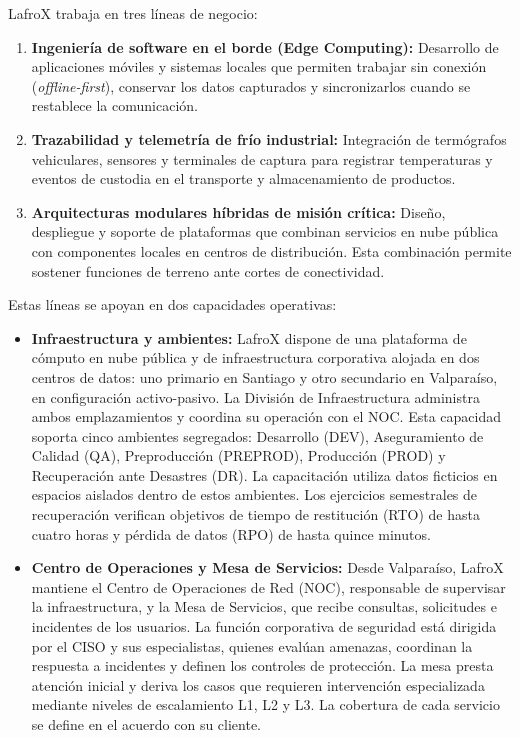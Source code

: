 LafroX trabaja en tres líneas de negocio:
\begin{enumerate}
    \item \textbf{Ingeniería de software en el borde (Edge Computing):} Desarrollo de aplicaciones móviles y sistemas locales que permiten trabajar sin conexión (\textit{offline-first}), conservar los datos capturados y sincronizarlos cuando se restablece la comunicación.
    \item \textbf{Trazabilidad y telemetría de frío industrial:} Integración de termógrafos vehiculares, sensores y terminales de captura para registrar temperaturas y eventos de custodia en el transporte y almacenamiento de productos.
    \item \textbf{Arquitecturas modulares híbridas de misión crítica:} Diseño, despliegue y soporte de plataformas que combinan servicios en nube pública con componentes locales en centros de distribución. Esta combinación permite sostener funciones de terreno ante cortes de conectividad.
\end{enumerate}

Estas líneas se apoyan en dos capacidades operativas:
\begin{itemize}
    \item \textbf{Infraestructura y ambientes:} LafroX dispone de una plataforma de cómputo en nube pública y de infraestructura corporativa alojada en dos centros de datos: uno primario en Santiago y otro secundario en Valparaíso, en configuración activo-pasivo. La División de Infraestructura administra ambos emplazamientos y coordina su operación con el NOC. Esta capacidad soporta cinco ambientes segregados: Desarrollo (DEV), Aseguramiento de Calidad (QA), Preproducción (PREPROD), Producción (PROD) y Recuperación ante Desastres (DR). La capacitación utiliza datos ficticios en espacios aislados dentro de estos ambientes. Los ejercicios semestrales de recuperación verifican objetivos de tiempo de restitución (RTO) de hasta cuatro horas y pérdida de datos (RPO) de hasta quince minutos.
    \item \textbf{Centro de Operaciones y Mesa de Servicios:} Desde Valparaíso, LafroX mantiene el Centro de Operaciones de Red (NOC), responsable de supervisar la infraestructura, y la Mesa de Servicios, que recibe consultas, solicitudes e incidentes de los usuarios. La función corporativa de seguridad está dirigida por el CISO y sus especialistas, quienes evalúan amenazas, coordinan la respuesta a incidentes y definen los controles de protección. La mesa presta atención inicial y deriva los casos que requieren intervención especializada mediante niveles de escalamiento L1, L2 y L3. La cobertura de cada servicio se define en el acuerdo con su cliente.
\end{itemize}

